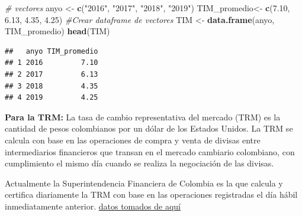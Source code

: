 \documentclass[
  11pt,
]{book}
\newenvironment{Shaded}{\begin{snugshade}}{\end{snugshade}}
\newcommand{\CommentTok}[1]{\textcolor[rgb]{0.56,0.35,0.01}{\textit{#1}}}
\newcommand{\FloatTok}[1]{\textcolor[rgb]{0.00,0.00,0.81}{#1}}
\newcommand{\KeywordTok}[1]{\textcolor[rgb]{0.13,0.29,0.53}{\textbf{#1}}}
\newcommand{\NormalTok}[1]{#1}
\newcommand{\StringTok}[1]{\textcolor[rgb]{0.31,0.60,0.02}{#1}}
\begin{document}
\begin{Shaded}
\begin{Highlighting}[]
\CommentTok{# vectores }
\NormalTok{anyo <-}\StringTok{ }\KeywordTok{c}\NormalTok{(}\StringTok{"2016"}\NormalTok{, }\StringTok{"2017"}\NormalTok{, }\StringTok{"2018"}\NormalTok{, }\StringTok{"2019"}\NormalTok{)}
\NormalTok{TIM_promedio<-}\StringTok{ }\KeywordTok{c}\NormalTok{(}\FloatTok{7.10}\NormalTok{, }\FloatTok{6.13}\NormalTok{, }\FloatTok{4.35}\NormalTok{, }\FloatTok{4.25}\NormalTok{)}
\CommentTok{#Crear dataframe de vectores}
\NormalTok{TIM <-}\StringTok{ }\KeywordTok{data.frame}\NormalTok{(anyo, TIM_promedio)}
\KeywordTok{head}\NormalTok{(TIM)}
\end{Highlighting}
\end{Shaded}

\begin{verbatim}
##   anyo TIM_promedio
## 1 2016         7.10
## 2 2017         6.13
## 3 2018         4.35
## 4 2019         4.25
\end{verbatim}

\textbf{Para la TRM:} La tasa de cambio representativa del mercado (TRM)
es la cantidad de pesos colombianos por un dólar de los Estados Unidos.
La TRM se calcula con base en las operaciones de compra y venta de
divisas entre intermediarios financieros que transan en el mercado
cambiario colombiano, con cumplimiento el mismo día cuando se realiza la
negociación de las divisas.

Actualmente la Superintendencia Financiera de Colombia es la que calcula
y certifica diariamente la TRM con base en las operaciones registradas
el día hábil inmediatamente anterior.
\href{https://www.dolar-colombia.com/historico}{datos tomados de aquí}
\end{document}
